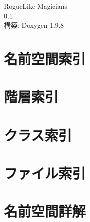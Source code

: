 \documentclass[twoside]{book}
\newcommand{\+}{\discretionary{\mbox{\scriptsize$\hookleftarrow$}}{}{}}
\newcommand{\clearemptydoublepage}{%
    \newpage{\pagestyle{empty}\cleardoublepage}%
  }
\begin{document}
  \raggedbottom
  \begin{CJK}{UTF8}{min}
    \hypersetup{pageanchor=false,
                bookmarksnumbered=true,
                pdfencoding=unicode
               }
  \begin{titlepage}
  \vspace*{7cm}
  \begin{center}%
  {\Large Rogue\+Like Magicians}\\
  [1ex]\large 0.\+1 \\
  \vspace*{1cm}
  {\large 構築\+: Doxygen 1.9.8}\\
  \end{center}
  \end{titlepage}
  \clearemptydoublepage
  \tableofcontents
  \clearemptydoublepage
  \hypersetup{pageanchor=true}
\chapter{名前空間索引}

\chapter{階層索引}

\chapter{クラス索引}

\chapter{ファイル索引}

\chapter{名前空間詳解}











\end{CJK}
\end{document}
